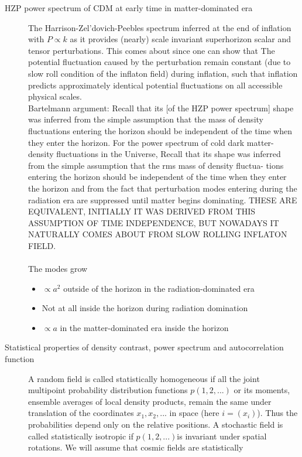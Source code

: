 \begin{description}
	\item[HZP power spectrum of CDM at early time in matter-dominated era] The Harrison-Zel'dovich-Peebles spectrum inferred at the end of inflation with $P \propto k$ as it provides (nearly) scale invariant superhorizon scalar and tensor perturbations. This comes about since one can show that The potential
	fluctuation caused by the perturbation remain constant (due to slow roll condition of the inflaton field) during
	inflation, such that inflation predicts approximately identical
	potential fluctuations on all accessible physical scales.
	\\
	Bartelmann argument: Recall that its [of the HZP power spectrum] shape was inferred from the
	simple assumption that the mass of density fluctuations entering
	the horizon should be independent of the time when they enter the
	horizon. For the power spectrum of cold dark matter-
	density fluctuations in the Universe, Recall that its shape was inferred from the
	simple assumption that the rms mass of density fluctua-
	tions entering the horizon should be independent of the
	time when they enter the horizon and from the fact that
	perturbation modes entering during the radiation era
	are suppressed until matter begins dominating.
	THESE ARE EQUIVALENT, INITIALLY IT WAS DERIVED FROM THIS ASSUMPTION OF TIME INDEPENDENCE, BUT NOWADAYS IT NATURALLY COMES ABOUT FROM SLOW ROLLING INFLATON FIELD.
	\\
	\\
	The modes grow \begin{itemize}
		\item $\propto a^2$ outside of the horizon in the radiation-dominated era
		\item Not at all inside the horizon during radiation domination
		\item $\propto a$ in the matter-dominated era inside the horizon
	\end{itemize}
	\item[Statistical properties of density contrast, power spectrum and autocorrelation function] 	A random field is called statistically homogeneous if all the joint multipoint probability distribution functions $ p(1,2,...)$ or its moments, ensemble averages of local density products, remain
	the same under translation of the coordinates $x_1,x_2,...$ in space (here $i=(x_i)$). Thus the probabilities depend only on the relative positions. A stochastic field is called statistically isotropic if
	$p(1,2,...) $is invariant under spatial rotations. We will assume that cosmic fields are statistically

\end{description}
